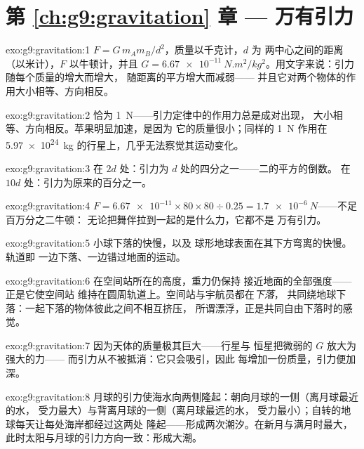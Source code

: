 \section*{第 \ref{ch:g9:gravitation} 章 --- 万有引力}

\begin{solution}{exo:g9:gravitation:1}
$F = G \, m_A m_B / d^2$，质量以千克计，$d$ 为
两中心之间的距离（以米计），$F$ 以牛顿计，并且
$G = \qty{6.67e-11}{N.m^2/kg^2}$。用文字来说：引力随每个质量的增大而增大，
随距离的平方增大而减弱——
并且它对两个物体的作用大小相等、方向相反。
\end{solution}

\begin{solution}{exo:g9:gravitation:2}
恰为 \qty{1}{N}——引力定律中的作用力总是成对出现，
大小相等、方向相反。苹果明显加速，是因为
它的质量很小；同样的 \qty{1}{N} 作用在
\qty{5.97e24}{kg} 的行星上，几乎无法察觉其运动变化。
\end{solution}

\begin{solution}{exo:g9:gravitation:3}
在 $2d$ 处：引力为 $d$ 处的四分之一——二的平方的倒数。
在 $10d$ 处：引力为原来的百分之一。
\end{solution}

\begin{solution}{exo:g9:gravitation:4}
$F = \num{6.67e-11} \times 80 \times 80 \div 0.25 =
\qty{1.7e-6}{N}$——不足百万分之二牛顿：
无论把舞伴拉到一起的是什么力，它都不是
万有引力。
\end{solution}

\begin{solution}{exo:g9:gravitation:5}
小球下落的快慢，以及
球形地球表面在其下方弯离的快慢。轨道即
一边下落、一边错过地面的运动。
\end{solution}

\begin{solution}{exo:g9:gravitation:6}
在空间站所在的高度，重力仍保持
接近地面的全部强度——正是它使空间站
维持在圆周轨道上。空间站与宇航员都在\emph{下落}，
共同绕地球下落：一起下落的物体彼此之间不相互挤压，
所谓漂浮，正是共同自由下落时的感觉。
\end{solution}

\begin{solution}{exo:g9:gravitation:7}
因为天体的质量极其巨大——行星与
恒星把微弱的 $G$ 放大为强大的力——
而引力从不被抵消：它只会吸引，因此
每增加一份质量，引力便加深。
\end{solution}

\begin{solution}{exo:g9:gravitation:8}
月球的引力使海水向两侧隆起：朝向月球的一侧（离月球最近的水，
受力最大）与背离月球的一侧（离月球最远的水，
受力最小）；自转的地球每天让每处海岸都经过这两处
隆起——形成两次潮汐。在新月与满月时最大，
此时太阳与月球的引力方向一致：形成大潮。
\end{solution}

